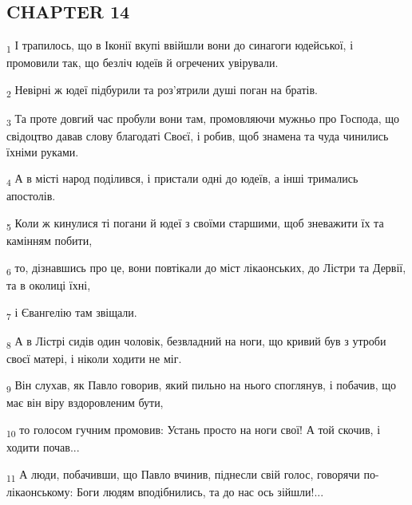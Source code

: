 \subsection{CHAPTER 14}
\begin{tcolorbox}
\textsubscript{1} І трапилось, що в Іконії вкупі ввійшли вони до синагоги юдейської, і промовили так, що безліч юдеїв й огречених увірували.
\end{tcolorbox}
\begin{tcolorbox}
\textsubscript{2} Невірні ж юдеї підбурили та роз'ятрили душі поган на братів.
\end{tcolorbox}
\begin{tcolorbox}
\textsubscript{3} Та проте довгий час пробули вони там, промовляючи мужньо про Господа, що свідоцтво давав слову благодаті Своєї, і робив, щоб знамена та чуда чинились їхніми руками.
\end{tcolorbox}
\begin{tcolorbox}
\textsubscript{4} А в місті народ поділився, і пристали одні до юдеїв, а інші тримались апостолів.
\end{tcolorbox}
\begin{tcolorbox}
\textsubscript{5} Коли ж кинулися ті погани й юдеї з своїми старшими, щоб зневажити їх та камінням побити,
\end{tcolorbox}
\begin{tcolorbox}
\textsubscript{6} то, дізнавшись про це, вони повтікали до міст лікаонських, до Лістри та Дервії, та в околиці їхні,
\end{tcolorbox}
\begin{tcolorbox}
\textsubscript{7} і Євангелію там звіщали.
\end{tcolorbox}
\begin{tcolorbox}
\textsubscript{8} А в Лістрі сидів один чоловік, безвладний на ноги, що кривий був з утроби своєї матері, і ніколи ходити не міг.
\end{tcolorbox}
\begin{tcolorbox}
\textsubscript{9} Він слухав, як Павло говорив, який пильно на нього споглянув, і побачив, що має він віру вздоровленим бути,
\end{tcolorbox}
\begin{tcolorbox}
\textsubscript{10} то голосом гучним промовив: Устань просто на ноги свої! А той скочив, і ходити почав...
\end{tcolorbox}
\begin{tcolorbox}
\textsubscript{11} А люди, побачивши, що Павло вчинив, піднесли свій голос, говорячи по-лікаонському: Боги людям вподібнились, та до нас ось зійшли!...
\end{tcolorbox}
